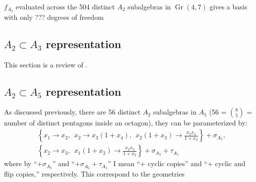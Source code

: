 \documentclass[11pt]{article}
\DeclareMathOperator{\Gr}{Gr}
\def\pdfeq#1{\texorpdfstring{$#1$}{a}}
\def\drawOctagon{
\coordinate (P1) at (45:1);
\coordinate (P2) at (90:1);
\coordinate (P3) at (135:1);
\coordinate (P4) at (180:1);
\coordinate (P5) at (225:1);
\coordinate (P6) at (270:1);
\coordinate (P7) at (315:1);
\coordinate (P8) at (359:1);
\draw (P1) -- (P2) -- (P3) -- (P4) -- (P5) -- (P6) -- (P7) -- (P8) -- cycle;
}
\begin{document}
$f_{A_2}$ evaluated across the 504 distinct $A_2$ subalgebras in $\Gr(4,7)$ gives a basis with only ??? degrees of freedom

\subsection{\pdfeq{A_2\subset A_3} representation}
This section is a review of \cite{Golden:2014xqa,Golden:2014xqf}. 


\subsection{\pdfeq{A_2\subset A_5} representation}
As discussed previously, there are 56 distinct $A_2$ subalgebras in $A_5$ (56 = $\genfrac(){0pt}{1}{8}{5}$ = number of distinct pentagons inside an octagon), they can be parameterized by:
\begin{equation}
\begin{split}
	&\left\{x_1\to x_2,~~
	x_2\to x_3\left(1+x_4\right),~~
	x_2\left(1+x_3\right)\to \frac{x_3 x_4}{1+x_3}\right\} + \sigma_{A_5},\\
	&\left\{x_2\to x_3,~~x_1 \left(1+x_2\right)\to \frac{x_2x_3}{1+x_2}\right\} + \sigma_{A_5} + \tau_{A_5} 
   \end{split}
\end{equation}
where by ``$+\sigma_{A_5}$'' and ``$+\sigma_{A_5}+\tau_{A_5}$'' I mean ``+ cyclic copies'' and ``+ cyclic and flip copies,'' respectively. This correspond to the geometries
\begin{center}
\end{center}
\end{document}

